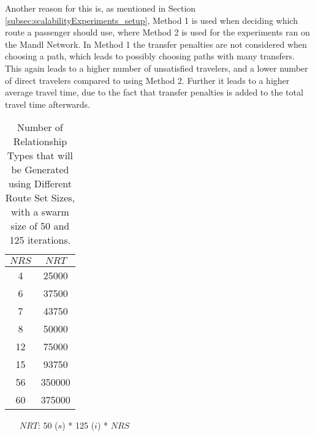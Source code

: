 Another reason for this is, as mentioned in Section \vref{subsec:scalabilityExperiments_setup}, Method 1 is used when deciding which route a passenger should use, where Method 2 is used for the experiments ran on the Mandl Network. In Method 1 the transfer penalties are not considered when choosing a path, which leads to possibly choosing paths with many transfers. This again leads to a higher number of unsatisfied travelers, and a lower number of direct travelers compared to using Method 2. Further it leads to a higher average travel time, due to the fact that transfer penalties is added to the total travel time afterwards. 


\begin{table}[H]
    \centering
    \hspace*{-1.0cm}
    \begin{tabular}{|c|c|}
        \hline
        \textbf{$NRS$} & \textbf{$NRT$}\\
        \hline
        4 & 25000\\
        \hline
        6 & 37500\\
        \hline
        7 & 43750\\
        \hline
        8 & 50000\\
        \hline
        12 & 75000\\
        \hline
        15 & 93750\\
        \hline
        56 & 350000\\
        \hline
        60 & 375000\\
        \hline
    \end{tabular}
    \caption{Number of Relationship Types that will be Generated using Different Route Set Sizes, with a swarm size of 50 and 125 iterations.}
    \begin{itemize}[noitemsep]
    \item[$NRT$:] 50 ($s$) * 125 ($i$) * $NRS$
    \end{itemize} 
    \label{tabel:numberOfRelationshipTypes}
\end{table} 

